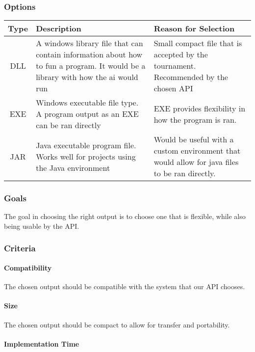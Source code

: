 \subsubsection{Options}
\begin{center}
	\begin{tabular}{ ||C|L|L|| } 
		\hline
		Type & Description & Reason for Selection \\
		\hline
		DLL & A windows library file that can contain information about how to fun a program. It would be a library with how the ai would run & Small compact file that is accepted by the tournament. Recommended by the chosen API \\ 
		\hline
		EXE & Windows executable file type. A program output as an EXE can be ran directly & EXE provides flexibility in how the program is ran. \\ 
		\hline
		JAR & Java executable program file. Works well for projects using the Java environment & Would be useful with a custom environment that would allow for java files to be ran directly. \\ 
		\hline
	\end{tabular}
\end{center}
\subsubsection{Goals}
The goal in choosing the right output is to choose one that is flexible, while also being usable by the API.
\subsubsection{Criteria}
\paragraph{Compatibility}
The chosen output should be compatible with the system that our API chooses.
\paragraph{Size}
The chosen output should be compact to allow for transfer and portability.
\paragraph{Implementation Time}
